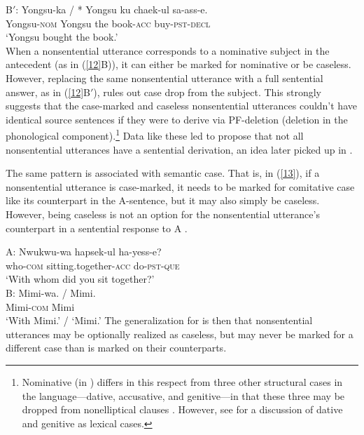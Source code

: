 B$'$: \gll Yongsu-ka            /  *  Yongsu ku  chaek-ul          sa-ass-e.\\
           Yongsu-\textsc{nom}  {} {} Yongsu the book-\textsc{acc} buy-\textsc{pst}-\textsc{decl}\\
\glt  \hphantom{B$'$:~}`Yongsu bought the book.'\\
\label{12}
\z
%
When a nonsentential utterance  corresponds to a nominative subject in the antecedent (as in (\ref{12}B)), it can either be marked for nominative or be caseless.
However, replacing the same nonsentential utterance  with a full sentential answer, as in (\ref{12}B$'$), rules out case drop from the subject. This strongly suggests that the case-marked and caseless nonsentential utterances couldn't have identical source sentences if they were to derive via PF-deletion (deletion in the phonological component).\footnote{Nominative (in ) differs in this respect from three other structural cases in the language---dative, accusative, and genitive---in that these three may be dropped from nonelliptical clauses \citep[see][]{Morgan1989, Lee2016, Kim2016}. However, see \citet{Mueller2002b} for a discussion of  dative and genitive as lexical cases.}  Data like these led \citet{Morgan1989} to propose that not all nonsentential utterances have a sentential derivation, an idea later picked up in \citet{Barton1998}.

The same pattern is associated with semantic case. That is, in (\ref{13}), if a nonsentential utterance is case-marked, it needs
to be marked for comitative case like its counterpart in the A-sentence, but it may also simply be caseless. However,  
being caseless is not an option for the nonsentential utterance's counterpart in a sentential response to A \citep[280]{Kim2015}.

\ea
A:
\gll Nwukwu-wa          hapsek-ul                     ha-yess-e?\\
     who-\textsc{com}   sitting.together-\textsc{acc} do-\textsc{pst}-\textsc{que}\\
\glt  \hphantom{A:~}`With whom did you sit together?'\\

B:
\gll Mimi-wa. 			/ Mimi.\\
     Mimi-\textsc{com} {} Mimi\\
\glt \hphantom{B:~}`With Mimi.' / `Mimi.' \label{13}\z
%
The generalization for  is then that nonsentential utterances may be optionally realized as caseless, but may never be marked for a different case than is marked on their counterparts.

